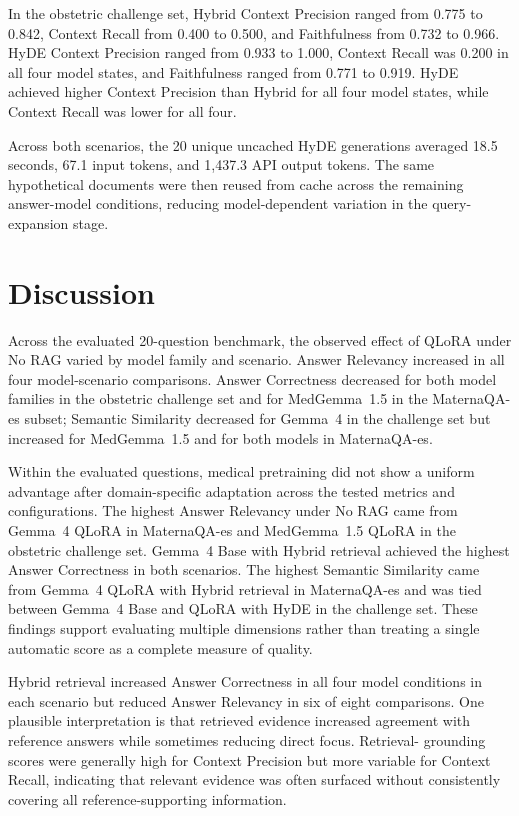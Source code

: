 In the obstetric challenge set, Hybrid Context Precision ranged from 0.775
to 0.842, Context Recall from 0.400 to 0.500, and Faithfulness from 0.732
to 0.966. HyDE Context Precision ranged from 0.933 to 1.000, Context Recall
was 0.200 in all four model states, and Faithfulness ranged from 0.771 to
0.919. HyDE achieved higher Context Precision than Hybrid for all four model
states, while Context Recall was lower for all four.

Across both scenarios, the 20 unique uncached HyDE generations averaged
18.5 seconds, 67.1 input tokens, and 1,437.3 API output tokens. The same
hypothetical documents were then reused from cache across the remaining
answer-model conditions, reducing model-dependent variation in the
query-expansion stage.
\section{Discussion}
Across the evaluated 20-question benchmark, the observed effect of QLoRA
under No RAG varied by model family and scenario. Answer Relevancy increased
in all four model-scenario comparisons. Answer Correctness decreased for both
model families in the obstetric challenge set and for MedGemma~1.5 in the
MaternaQA-es subset; Semantic Similarity decreased for Gemma~4 in the challenge
set but increased for MedGemma~1.5 and for both models in MaternaQA-es.

Within the evaluated questions, medical pretraining did not show a uniform
advantage after domain-specific adaptation across the tested metrics and
configurations. The highest Answer Relevancy under No RAG came from Gemma~4
QLoRA in MaternaQA-es and MedGemma~1.5 QLoRA in the obstetric challenge set.
Gemma~4 Base with Hybrid retrieval achieved the highest Answer Correctness in
both scenarios. The highest Semantic Similarity came from Gemma~4 QLoRA with
Hybrid retrieval in MaternaQA-es and was tied between Gemma~4 Base and QLoRA
with HyDE in the challenge set. These findings support evaluating multiple
dimensions rather than treating a single automatic score as a complete
measure of quality.

Hybrid retrieval increased Answer Correctness in all four model conditions
in each scenario but reduced Answer Relevancy in six of eight comparisons.
One plausible interpretation is that retrieved evidence increased agreement
with reference answers while sometimes reducing direct focus. Retrieval-
grounding scores were generally high for Context Precision but more variable
for Context Recall, indicating that relevant evidence was often surfaced
without consistently covering all reference-supporting information.

